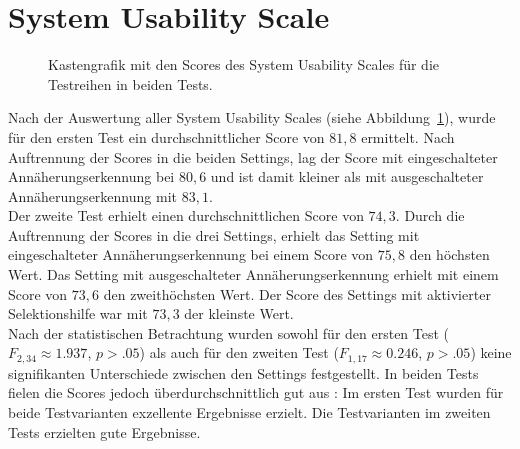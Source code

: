 \documentclass[12pt,numbers=noenddot,parskip,bibliography=totocnumbered,listof=totocnumbered]{scrreprt}
\begin{document}
\section{System Usability Scale}
\begin{figure}
\centering
{}
\hfill
{}
\caption{Kastengrafik mit den Scores des System Usability Scales für die Testreihen in beiden Tests.}
\label{ergebnisSUS}
\end{figure}
Nach der Auswertung aller System Usability Scales (siehe Abbildung~\ref{ergebnisSUS}), wurde für den ersten Test ein durchschnittlicher Score von $81{,}8$ ermittelt. Nach Auftrennung der Scores in die beiden Settings, lag der Score mit eingeschalteter Annäherungserkennung bei $80{,}6$ und ist damit kleiner als mit ausgeschalteter Annäherungserkennung mit $83{,}1$.\\
Der zweite Test erhielt einen durchschnittlichen Score von $74{,}3$. Durch die Auftrennung der Scores in die drei Settings, erhielt das Setting mit eingeschalteter Annäherungserkennung bei einem Score von $75{,}8$ den höchsten Wert. Das Setting mit ausgeschalteter Annäherungserkennung erhielt mit einem Score von $73{,}6$ den zweithöchsten Wert. Der Score des Settings mit aktivierter Selektionshilfe war mit $73{,}3$ der kleinste Wert.\\
Nach der statistischen Betrachtung wurden sowohl für den ersten Test ($F_{2,34}\approx 1.937$, $p > .05$) als auch für den zweiten Test ($F_{1,17}\approx 0.246$, $p > .05$) keine signifikanten Unterschiede zwischen den Settings festgestellt. In beiden Tests fielen die Scores jedoch überdurchschnittlich gut aus \citep{sus2013}: Im ersten Test wurden für beide Testvarianten exzellente Ergebnisse erzielt. Die Testvarianten im zweiten Tests erzielten gute Ergebnisse.
\end{document}
